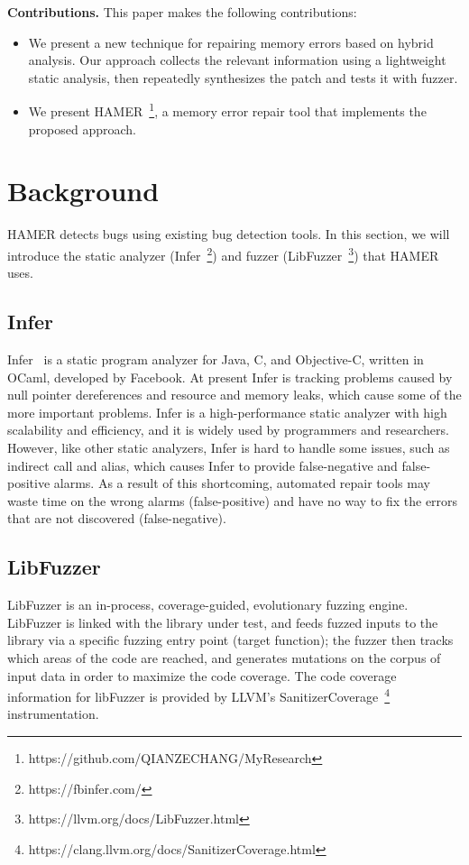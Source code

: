 \documentclass[a4paper,11pt,oneside,openany]{book}
\begin{document}
\textbf{Contributions.} This paper makes the following contributions:
\begin{itemize}
  \item We present a new technique for repairing memory errors based on hybrid analysis. Our approach collects the relevant information using a lightweight static analysis, then repeatedly synthesizes the patch and tests it with fuzzer.
  \item We present HAMER~\footnote{https://github.com/QIANZECHANG/MyResearch}, a memory error repair tool that implements the proposed approach.
\end{itemize}


\chapter{Background}

HAMER detects bugs using existing bug detection tools. In this section, we will introduce the static analyzer (Infer~\footnote{https://fbinfer.com/}) and fuzzer (LibFuzzer~\footnote{https://llvm.org/docs/LibFuzzer.html}) that HAMER uses.

\section{Infer}

Infer~\cite{infer} is a static program analyzer for Java, C, and Objective-C, written in OCaml, developed by Facebook. At present Infer is tracking problems caused by null pointer dereferences and resource and memory leaks, which cause some of the more important problems. Infer is a high-performance static analyzer with high scalability and efficiency, and it is widely used by programmers and researchers. However, like other static analyzers, Infer is hard to handle some issues, such as indirect call and alias, which causes Infer to provide false-negative and false-positive alarms. As a result of this shortcoming, automated repair tools may waste time on the wrong alarms (false-positive) and have no way to fix the errors that are not discovered (false-negative).


\section{LibFuzzer}
LibFuzzer is an in-process, coverage-guided, evolutionary fuzzing engine. LibFuzzer is linked with the library under test, and feeds fuzzed inputs to the library via a specific fuzzing entry point (target function); the fuzzer then tracks which areas of the code are reached, and generates mutations on the corpus of input data in order to maximize the code coverage. The code coverage information for libFuzzer is provided by LLVM's SanitizerCoverage~\footnote{https://clang.llvm.org/docs/SanitizerCoverage.html} instrumentation.
\end{document}
